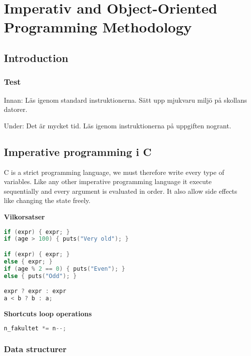 \chapter{Imperativ and Object-Oriented Programming Methodology}

\newpage


\begin{multicols}{2}
\section{Introduction}

\subsection{Test}
Innan: 
Läs igenom standard instruktionerna.
Sätt upp mjukvaru miljö på skollans datorer.

Under:
Det är mycket tid. 
Läs igenom instruktionerna på uppgiften nogrant.



\section{Imperative programming i C}
C is a strict programming language, we must therefore write every type of variables.
Like any other imperative programming language it execute sequentially and every argument is evaluated
in order. It also allow side effects like changing the state freely. 

\noindent\textbf{Vilkorsatser}
\begin{lstlisting}[language=C]
if (expr) { expr; } 
if (age > 100) { puts("Very old"); } 

if (expr) { expr; } 
else { expr; }
if (age % 2 == 0) { puts("Even"); } 
else { puts("Odd"); }

expr ? expr : expr
a < b ? b : a;
\end{lstlisting}

\noindent\textbf{Shortcuts loop operations}
\begin{lstlisting}[language=C]
n_fakultet *= n--;
\end{lstlisting}


\subsection{Data structurer}

\end{multicols}

